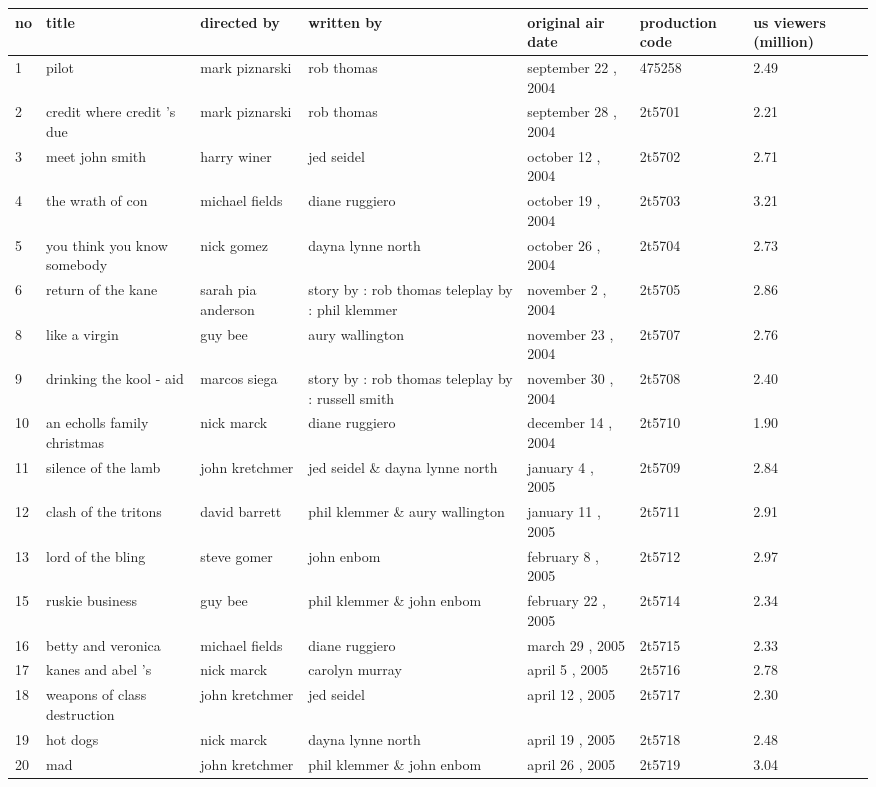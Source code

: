 \documentclass{article}
\begin{document}
\begin{tabular}{lllllll}
\toprule
no & title & directed by & written by & original air date & production code & us viewers (million) \\
\midrule
1 & pilot & mark piznarski & rob thomas & september 22 , 2004 & 475258 & 2.49 \\
2 & credit where credit 's due & mark piznarski & rob thomas & september 28 , 2004 & 2t5701 & 2.21 \\
3 & meet john smith & harry winer & jed seidel & october 12 , 2004 & 2t5702 & 2.71 \\
4 & the wrath of con & michael fields & diane ruggiero & october 19 , 2004 & 2t5703 & 3.21 \\
5 & you think you know somebody & nick gomez & dayna lynne north & october 26 , 2004 & 2t5704 & 2.73 \\
6 & return of the kane & sarah pia anderson & story by : rob thomas teleplay by : phil klemmer & november 2 , 2004 & 2t5705 & 2.86 \\
8 & like a virgin & guy bee & aury wallington & november 23 , 2004 & 2t5707 & 2.76 \\
9 & drinking the kool - aid & marcos siega & story by : rob thomas teleplay by : russell smith & november 30 , 2004 & 2t5708 & 2.40 \\
10 & an echolls family christmas & nick marck & diane ruggiero & december 14 , 2004 & 2t5710 & 1.90 \\
11 & silence of the lamb & john kretchmer & jed seidel \& dayna lynne north & january 4 , 2005 & 2t5709 & 2.84 \\
12 & clash of the tritons & david barrett & phil klemmer \& aury wallington & january 11 , 2005 & 2t5711 & 2.91 \\
13 & lord of the bling & steve gomer & john enbom & february 8 , 2005 & 2t5712 & 2.97 \\
15 & ruskie business & guy bee & phil klemmer \& john enbom & february 22 , 2005 & 2t5714 & 2.34 \\
16 & betty and veronica & michael fields & diane ruggiero & march 29 , 2005 & 2t5715 & 2.33 \\
17 & kanes and abel 's & nick marck & carolyn murray & april 5 , 2005 & 2t5716 & 2.78 \\
18 & weapons of class destruction & john kretchmer & jed seidel & april 12 , 2005 & 2t5717 & 2.30 \\
19 & hot dogs & nick marck & dayna lynne north & april 19 , 2005 & 2t5718 & 2.48 \\
20 & mad & john kretchmer & phil klemmer \& john enbom & april 26 , 2005 & 2t5719 & 3.04 \\
\bottomrule
\end{tabular}
\end{document}
